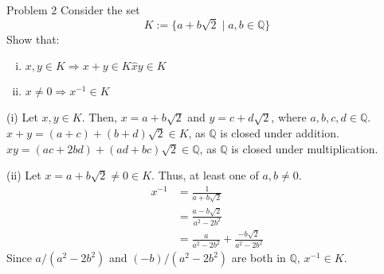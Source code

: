 \documentclass[10pt]{extarticle}
\newcommand{\Q}{\mathbb{Q}}
\begin{document}
  \begin{problem}{Problem 2}
    Consider the set
    \[
      K:= \{a + b\sqrt{2} \mid a,b\in\Q\}
    \] 
    Show that:
    \begin{enumerate}[(i)]
      \item $x,y\in K \Rightarrow x+y\in K \hat xy\in K$
      \item $x\neq 0 \Rightarrow x^{-1}\in K$
    \end{enumerate}
    \tcblower
    \begin{problem}{(i)}
      Let $x,y\in K$. Then, $x = a+b\sqrt{2}$ and $y = c+d\sqrt{2}$, where $a,b,c,d\in \Q$.\\

      $x+y = (a+c) + (b+d)\sqrt{2}\in K$, as $\Q$ is closed under addition.\\

      $xy = (ac + 2bd) + (ad + bc)\sqrt{2}\in\Q$, as $\Q$ is closed under multiplication.
    \end{problem}
    \begin{problem}{(ii)}
      Let $x=a+b\sqrt{2}\neq 0\in K$. Thus, at least one of $a,b\neq 0$.
      \begin{align*}
        x^{-1} &= \frac{1}{a+b\sqrt{2}}\\
               &= \frac{a-b\sqrt{2}}{a^2-2b^2}\\
               &= \frac{a}{a^2-2b^2} + \frac{-b\sqrt{2}}{a^2-2b^2}
      \end{align*}
      Since $a/(a^2 - 2b^2)$ and $(-b)/(a^2-2b^2)$ are both in $\Q$, $x^{-1}\in K$.
    \end{problem}
  \end{problem}
\end{document}
